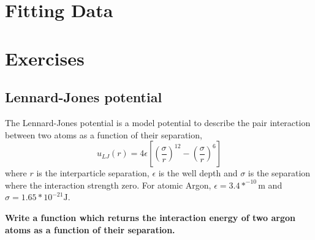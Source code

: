 \section{Fitting Data}


\section{Exercises}
	\subsection{Lennard-Jones potential}\label{LJ_excercise}
		The Lennard-Jones potential is a model potential to describe the pair interaction between two atoms as a function of their separation,
\begin{equation}u_{LJ}(r) = 4\epsilon \left [ \left (\frac{\sigma}{r} \right )^{12}- \left (\frac{\sigma}{r} \right )^{6} \right ]\end{equation}
	where $r$ is the interparticle separation, $\epsilon$ is the well depth and $\sigma$ is the separation where the interaction strength zero. For atomic Argon, $\epsilon = 3.4*^{-10} \mathrm{m}$ and $\sigma= 1.65*10^{-21} \mathrm{J}$.
	
\textbf{Write a function which returns the interaction energy of two argon atoms as a function of their separation.}

